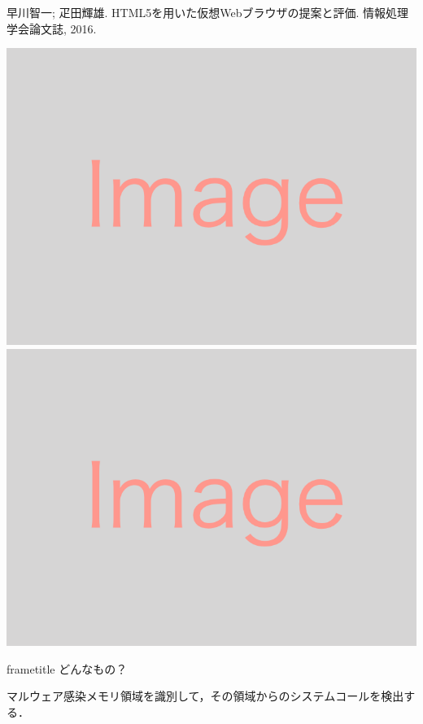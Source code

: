 \begin{frame}[plain,t]
  {早川智一; 疋田輝雄. HTML5を用いた仮想Webブラウザの提案と評価. 情報処理学会論文誌, 2016.}
  \begin{minipage}[t]{\linewidth}
      \includegraphics[height=0.15\textheight,keepaspectratio]{img/img.png}
      \includegraphics[height=0.15\textheight,keepaspectratio]{img/img.png}
  \end{minipage}

  \begin{multicols}{2}
    \begin{beamercolorbox}[rounded=true, center, shadow=true,wd=\linewidth]{frametitle}
      どんなもの？
    \end{beamercolorbox}
    マルウェア感染メモリ領域を識別して，その領域からのシステムコールを検出する．
    

\end{multicols}
\end{frame}
